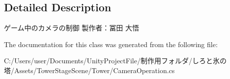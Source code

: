 \subsection{Detailed Description}
ゲーム中のカメラの制御 製作者：冨田 大悟 



The documentation for this class was generated from the following file\+:\begin{DoxyCompactItemize}
\item 
C\+:/\+Users/user/\+Documents/\+Unity\+Project\+File/制作用フォルダ/しろと氷の塔/\+Assets/\+Tower\+Stage\+Scene/\+Tower/Camera\+Operation.\+cs\end{DoxyCompactItemize}

